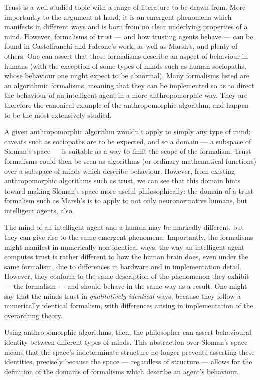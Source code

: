 Trust is a well-studied topic with a range of literature to be drawn from. More importantly to the argument at hand, it is an emergent phenomena which manifests in different ways and is born from no clear underlying properties of a mind. However, formalisms of trust --- and how trusting agents behave --- can be found in Castelfranchi and Falcone's work, as well as Marsh's, and plenty of others. One can assert that these formalisms describe an aspect of behaviour in humans (with the exception of some types of minds such as human sociopaths, whose behaviour one might expect to be abnormal). Many formalisms listed are an algorithmic formalisms, meaning that they can be implemented so as to direct the behaviour of an intelligent agent in a more anthropomorphic way. They are therefore the canonical example of the anthropomorphic algorithm, and happen to be the most extensively studied.\par

A given anthropomorphic algorithm wouldn't apply to simply any type of mind: caveats such as sociopaths are to be expected, and so a domain --- a subspace of Sloman's space --- is suitable as a way to limit the scope of the formalism. Trust formalisms could then be seen as algorithms (or ordinary mathematical functions) over a subspace of minds which describe behaviour. However, from existing anthropomorphic algorithms such as trust, we can see that this domain hints toward making Sloman's space more useful philosophically: the domain of a trust formalism such as Marsh's is to apply to not only neuronormative humans, but intelligent agents, also.\par

The mind of an intelligent agent and a human may be markedly different, but they can give rise to the same emergent phenomena. Importantly, the formalisms might manifest in numerically non-identical ways: the way an intelligent agent computes trust is rather different to how the human brain does, even under the same formalism, due to differences in hardware and in implementation detail. However, they conform to the same description of the phenomenon they exhibit --- the formalism --- and should behave in the same way as a result. One might say that the minds trust in \emph{qualitatively identical} ways, because they follow a numerically identical formalism, with differences arising in implementation of the overarching theory.\par

Using anthropomorphic algorithms, then, the philosopher can assert behavioural identity between different types of minds. This abstraction over Sloman's space means that the space's indeterminate structure no longer prevents asserting these identities, precisely because the space --- regardless of structure --- allows for the definition of the domains of formalisms which describe an agent's behaviour.\par

